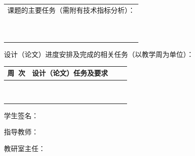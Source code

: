 \documentclass{ctexart}
\begin{document}
\vspace{6pt}
\begin{tabular}{p{\linewidth}}
课题的主要任务（需附有技术指标分析）： \\
\dotuline{\hfill} \\
\dotuline{\hfill} \\
\dotuline{\hfill} \\
\dotuline{\hfill} \\
\dotuline{\hfill} \\
\dotuline{\hfill} \\
\dotuline{\hfill} \\
\dotuline{\hfill} \\
\dotuline{\hfill} \\
\dotuline{\hfill}
\end{tabular}

\vspace{6pt}

设计（论文）进度安排及完成的相关任务（以教学周为单位）：
\begin{center}
\setlength{\tabcolsep}{1em}
\begin{tabular}{|c|p{0.8\linewidth}|}
\hline
周\ 次 &  {\centering 设计（论文）任务及要求\par} \\
\hline
& \\
\hline
& \\
\hline
& \\
\hline
& \\
\hline
& \\
\hline
& \\
\hline
& \\
\hline
& \\
\hline
& \\
\hline
\end{tabular}

\end{center}

\vspace{1em}

{\fontsize{14pt}{27pt}\selectfont\normalfont\heiti
\raggedleft 学生签名：\underline{\makebox[6em][l]{\hfill}}\makebox[2em]{}

\raggedleft 指导教师：\underline{\makebox[6em][l]{\hfill}}\makebox[2em]{}

\raggedleft 教研室主任：\underline{\makebox[6em][l]{\hfill}}\makebox[2em]{}

}
\end{document}
